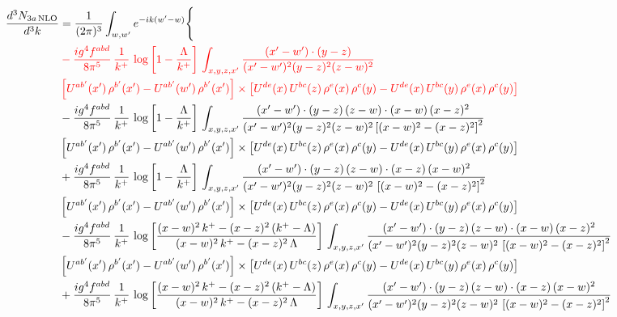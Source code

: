 \documentclass[9pt]{article}
\newcommand{\rc}{\color{red}}
\numberwithin{equation}{section}
\begin{document}
\begin{align}
\frac{d^{3}N_{3a\,\rm NLO}}{d^{3}k} & =\frac{1}{(2\pi)^{3}}\int_{w,w'}e^{-ik(w'-w)}\Bigg\{\notag \\ & \rc -\frac{ig^{4}f^{abd}}{8\pi^{5}}\,\frac{1}{k^{+}}\, \log{\left[1-\frac{\Lambda}{k^{+}}\right]}\,\int_{x,y,z,x'}
\frac{(x'-w')\cdot(y-z)}{(x'-w')^{2}(y-z)^{2}(z-w)^{2}}\notag \\ & \rc \left[U^{ab'}(x')\,\rho^{b'}(x')-U^{ab'}(w')\, \rho^{b'}(x')\right]\times \left[U^{de}(x)\,U^{bc}(z)\, \rho^{e}(x)\,\rho^{c}(y)-U^{de}(x)\,U^{bc}(y)\,\rho^{e}(x)\,\rho^{c}(y)\right]\notag \\ & -\frac{ig^{4}f^{abd}}{8\pi^{5}}\,\frac{1}{k^{+}}\, \log{\left[1-\frac{\Lambda}{k^{+}}\right]}\,\int_{x,y,z,x'}
\frac{(x'-w')\cdot(y-z)\,(z-w)\cdot(x-w)\,(x-z)^{2}}{(x'-w')^{2}(y-z)^{2}(z-w)^{2}\left[(x-w)^{2}-(x-z)^{2}\right]^{2}}\notag \\ & \left[U^{ab'}(x')\,\rho^{b'}(x')-U^{ab'}(w')\, \rho^{b'}(x')\right]\times \left[U^{de}(x)\,U^{bc}(z)\, \rho^{e}(x)\,\rho^{c}(y)-U^{de}(x)\,U^{bc}(y)\,\rho^{e}(x)\,\rho^{c}(y)\right]\notag \\ & +\frac{ig^{4}f^{abd}}{8\pi^{5}}\,\frac{1}{k^{+}}\, \log{\left[1-\frac{\Lambda}{k^{+}}\right]}\,\int_{x,y,z,x'}
\frac{(x'-w')\cdot(y-z)\,(z-w)\cdot(x-z)\,(x-w)^{2}}{(x'-w')^{2}(y-z)^{2}(z-w)^{2}\,\left[(x-w)^{2}-(x-z)^{2}\right]^{2}}\notag \\ & \left[U^{ab'}(x')\,\rho^{b'}(x')-U^{ab'}(w')\, \rho^{b'}(x')\right]\times \left[U^{de}(x)\,U^{bc}(z)\, \rho^{e}(x)\,\rho^{c}(y)-U^{de}(x)\,U^{bc}(y)\,\rho^{e}(x)\,\rho^{c}(y)\right]\notag \\ & 
-\frac{ig^{4}f^{abd}}{8\pi^{5}}\,\frac{1}{k^{+}}\,\log{\left[\frac{(x-w)^{2}\,k^{+}-(x-z)^{2}\,(k^{+}-\Lambda)}{(x-w)^{2}\,k^{+}-(x-z)^{2}\,\Lambda}\right]}\,\int_{x,y,z,x'}
\frac{(x'-w')\cdot(y-z)\,(z-w)\cdot(x-w)\,(x-z)^{2}}{(x'-w')^{2}(y-z)^{2}(z-w)^{2}\,\left[(x-w)^{2}-(x-z)^{2}\right]^{2}}\notag \\ & \left[U^{ab'}(x')\,\rho^{b'}(x')-U^{ab'}(w')\, \rho^{b'}(x')\right]\times \left[U^{de}(x)\,U^{bc}(z)\, \rho^{e}(x)\,\rho^{c}(y)-U^{de}(x)\,U^{bc}(y)\,\rho^{e}(x)\,\rho^{c}(y)\right]\notag \\ & +\frac{ig^{4}f^{abd}}{8\pi^{5}}\,\frac{1}{k^{+}}\,\log{\left[\frac{(x-w)^{2}\,k^{+}-(x-z)^{2}\,(k^{+}-\Lambda)}{(x-w)^{2}\,k^{+}-(x-z)^{2}\,\Lambda}\right]}\,\int_{x,y,z,x'}
\frac{(x'-w')\cdot(y-z)\,(z-w)\cdot(x-z)\,(x-w)^{2}}{(x'-w')^{2}(y-z)^{2}(z-w)^{2}\,\left[(x-w)^{2}-(x-z)^{2}\right]^{2}}\notag \\ 

\end{align}
\end{document}

